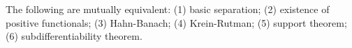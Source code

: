 The following are mutually equivalent: (1) basic separation; (2) existence of positive functionals; (3) Hahn-Banach; (4) Krein-Rutman; (5) support theorem; (6) subdifferentiability theorem.
